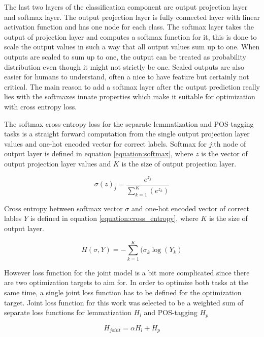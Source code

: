 \documentclass[12pt,a4paper,english
]{tutthesis}
\begin{document}
The last two layers of the classification component are output projection layer and softmax layer. The output projection layer is fully connected layer with linear activation function and has one node for each class. The softmax layer takes the output of projection layer and computes a softmax function for it, this is done to scale the output values in such a way that all output values sum up to one. When outputs are scaled to sum up to one, the output can be treated as probability distribution even though it might not strictly be one. Scaled outputs are also easier for humans to understand, often a nice to have feature but certainly not critical. The main reason to add a softmax layer after the output prediction really lies with the softmaxes innate properties which make it suitable for optimization with cross entropy loss.

The softmax cross-entropy loss for the separate lemmatization and POS-tagging tasks is a straight forward computation from the single output projection layer values and one-hot encoded vector for correct labels. Softmax for $j$:th node of output layer is defined in equation \ref{equation:softmax}, where $z$ is the vector of output projection layer values and $K$ is the size of output projection layer.

\begin{equation}
\label{equation:softmax}
\sigma(z)_j=\frac{e^{z_j}}{\sum_{k=1}^{K}(e^{z_k})}
\end{equation}

Cross entropy between softmax vector $\sigma$ and one-hot encoded vector of correct lables $Y$ is defined in equation \ref{equation:cross_entropy}, where $K$ is the size of output layer.

\begin{equation}
\label{equation:cross_entropy}
H(\sigma, Y) = -\sum_{k=1}^{K}(\sigma_k \log(Y_k)
\end{equation}

However loss function for the joint model is a bit more complicated since there are two optimization targets to aim for. In order to optimize both tasks at the same time, a single joint loss function has to be defined for the optimization target. Joint loss function for this work was selected to be a weighted sum of separate loss functions for lemmatization $H_l$ and POS-tagging $H_p$

\begin{equation}
\label{equation:joint_loss}
H_{joint}=\alpha H_l + H_p
\end{equation}
\end{document}
